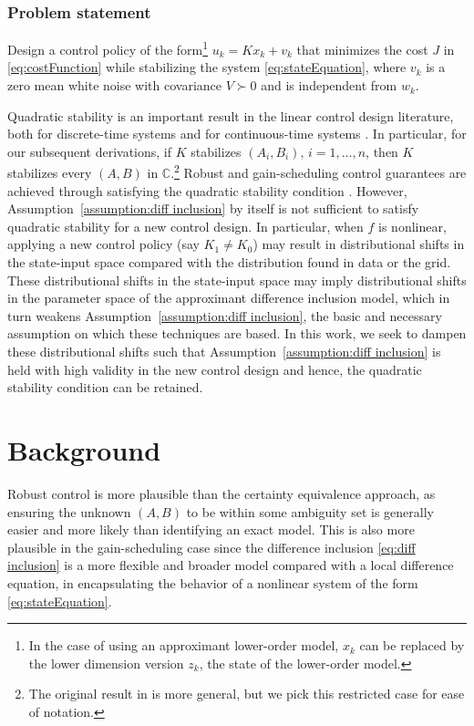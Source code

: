 \documentclass[letterpaper, 10 pt, conference]{ieeeconf}
\begin{document}
\subsubsection*{Problem statement} Design a control policy of the form\footnote{In the case of using an approximant lower-order model, $x_k$ can be replaced by the lower dimension version $z_k$, the state of the lower-order model.} $u_k = K x_k+v_k$ that minimizes the cost $J$ in \eqref{eq:costFunction} while stabilizing the system \eqref{eq:stateEquation}, where $v_k$ is a zero mean white noise with covariance $V \succ 0$ and is independent from $w_k$.

Quadratic stability is an important result in the linear control design literature, both for discrete-time systems \cite{amato1998note} and for continuous-time systems \cite{corless1994robust}. In particular, for our subsequent derivations, \cite[Theorem~1]{amato1998note} if $K$ stabilizes $(A_i,B_i),\,i=1,\hdots,n$, then $K$ stabilizes every $(A, B)$ in $\mathbb C$.\footnote{The original result in \cite{amato1998note} is more general, but we pick this restricted case for ease of notation.} Robust and gain-scheduling control guarantees are achieved through satisfying the quadratic stability condition \cite{boyd1993control}. However, Assumption~\ref{assumption:diff inclusion} by itself is not sufficient to satisfy quadratic stability for a new control design. In particular, when $f$ is nonlinear, applying a new control policy (say $K_1 \neq K_0$) may result in distributional shifts in the state-input space compared with the distribution found in data or the grid. These distributional shifts in the state-input space may imply distributional shifts in the parameter space of the approximant difference inclusion model, which in turn weakens Assumption~\ref{assumption:diff inclusion}, the basic and necessary assumption on which these techniques are based. In this work, we seek to dampen these distributional shifts such that Assumption~\ref{assumption:diff inclusion} is held with high validity in the new control design and hence, the quadratic stability condition can be retained.

\section{Background} \label{section: Background}
Robust control is more plausible than the certainty equivalence approach, as ensuring the unknown $(A,B)$ to be within some ambiguity set is generally easier and more likely than identifying an exact model. This is also more plausible in the gain-scheduling case since the difference inclusion \eqref{eq:diff inclusion} is a more flexible and broader model compared with a local difference equation, in encapsulating the behavior of a nonlinear system of the form \eqref{eq:stateEquation}. 
\end{document}
